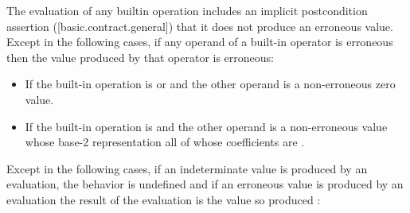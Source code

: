 \begin{adjustwidth}{0.5cm}{0.5cm}
\begin{addedblock}
The evaluation of any builtin operation includes an implicit postcondition assertion ([basic.contract.general])
that it does not produce an erroneous value.  Except in the following cases,
if any operand of a built-in operator is erroneous then the value
produced by that operator is erroneous:
\begin{itemize}
\item  If the built-in operation is \tcode{*} or \tcode{\&} and the other operand is a non-erroneous zero value.
\item  If the built-in operation is \tcode{|} and the other operand is a non-erroneous value whose base-2 representation all of whose coefficients are .
\end{itemize}
\end{addedblock}

Except in the following cases,
if an indeterminate value is produced by an evaluation,
the behavior is undefined
 and if an erroneous value is produced by an evaluation
the result of the evaluation is the value so produced 
:


\end{adjustwidth}
